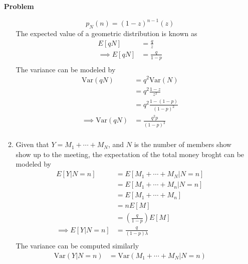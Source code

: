 \documentclass[12pt]{article}
\newenvironment{Ex}{\textbf{Problem}\vspace{.75em}\\}{}
\begin{document}
\begin{enumerate}
\begin{Ex}
\begin{solution}
\begin{enumerate}
\begin{equation}
          \label{eq:4a-pmf-z}
          p_N(n) = (1-z)^{n-1}(z)
        \end{equation}
        The expected value of a geometric distribution is known as
        \begin{equation}
          \label{eq:4a-expectation-z}
          \begin{aligned}
            E[qN] &= \frac{q}{z} \\
            \implies E[qN] &= \frac{q}{1-p} \\
          \end{aligned}
        \end{equation}
        The variance can be modeled by
        \begin{equation}
          \label{eq:4-variance}
          \begin{aligned}
            \text{Var}(qN) &= q^2\text{Var}(N) \\
            &= q^2\frac{1-z}{z^2} \\
            &= q^2\frac{1-(1-p)}{(1-p)^2} \\
            \implies \text{Var}(qN) &= \frac{q^2p}{(1-p)^2} \\
          \end{aligned}
        \end{equation}
      \item Given that $Y=M_1 + \cdots + M_N$, and $N$ is the number
        of members show show up to the meeting, the expectation of the
        total money broght can be modeled by
        \begin{equation}
          \label{eq:4b-expectation}
          \begin{aligned}
            E[Y|N=n] &= E[M_1 + \cdots + M_N | N=n] \\
            &= E[M_1 + \cdots + M_n | N=n] \\
            &= E[M_1 + \cdots + M_n] \\
            &= n E[M] \\
            &= \left(\frac{q}{1-p}\right)E[M] \\
            \implies E[Y|N=n] &= \frac{q}{(1-p)\lambda} \\
          \end{aligned}
        \end{equation}
        The variance can be computed similarly
        \begin{equation}
          \label{eq:4b-variance}
          \begin{aligned}
            \text{Var}(Y|N=n) &= \text{Var}(M_1 + \cdots + M_N|N=n) \\

\end{aligned}
\end{equation}
\end{enumerate}
\end{solution}
\end{Ex}
\end{enumerate}
\end{document}
